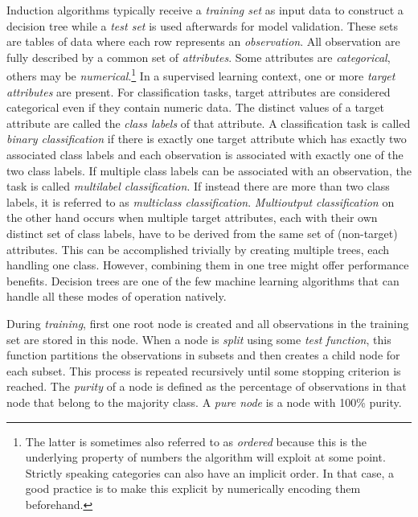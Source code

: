 Induction algorithms typically receive a \emph{training set} as input data to construct a decision tree while a \emph{test set} is used afterwards for model validation. These sets are tables of data where each row represents an \emph{observation}. All observation are fully described by a common set of \emph{attributes}. Some attributes are \emph{categorical}, others may be \emph{numerical}.\footnote{The latter is sometimes also referred to as \emph{ordered} because this is the underlying property of numbers the algorithm will exploit at some point. Strictly speaking categories can also have an implicit order. In that case, a good practice is to make this explicit by numerically encoding them beforehand.} In a supervised learning context, one or more \emph{target attributes} are present. For classification tasks, target attributes are considered categorical even if they contain numeric data. The distinct values of a target attribute are called the \emph{class labels} of that attribute. A classification task is called \emph{binary classification} if there is exactly one target attribute which has exactly two associated class labels and each observation is associated with exactly one of the two class labels. If multiple class labels can be associated with an observation, the task is called \emph{multilabel classification}. If instead there are more than two class labels, it is referred to as \emph{multiclass classification}. \emph{Multioutput classification} on the other hand occurs when multiple target attributes, each with their own distinct set of class labels, have to be derived from the same set of (non-target) attributes. This can be accomplished trivially by creating multiple trees, each handling one class. However, combining them in one tree might offer performance benefits. Decision trees are one of the few machine learning algorithms that can handle all these modes of operation natively.

During \emph{training}, first one root node is created and all observations in the training set are stored in this node. When a node is \emph{split} using some \emph{test function}, this function partitions the observations in subsets and then creates a child node for each subset. This process is repeated recursively until some stopping criterion is reached. The \emph{purity} of a node is defined as the percentage of observations in that node that belong to the majority class. A \emph{pure node} is a node with 100\% purity.

